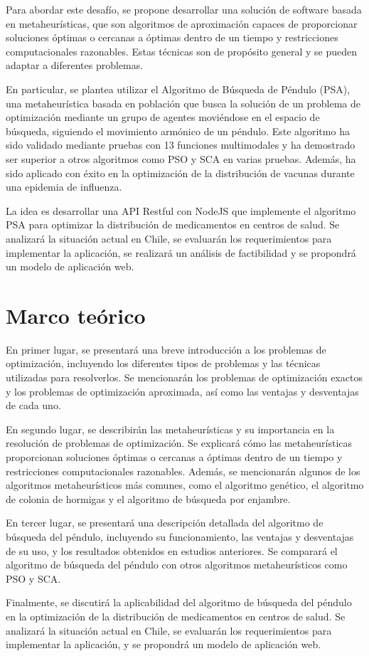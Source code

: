 \documentclass{ieeeaccess}
\begin{document}
Para abordar este desafío, se propone desarrollar una solución de software basada en metaheurísticas, que son algoritmos de aproximación capaces de proporcionar soluciones óptimas o cercanas a óptimas dentro de un tiempo y restricciones computacionales razonables. Estas técnicas son de propósito general y se pueden adaptar a diferentes problemas.

En particular, se plantea utilizar el Algoritmo de Búsqueda de Péndulo (PSA), una metaheurística basada en población que busca la solución de un problema de optimización mediante un grupo de agentes moviéndose en el espacio de búsqueda, siguiendo el movimiento armónico de un péndulo. Este algoritmo ha sido validado mediante pruebas con 13 funciones multimodales y ha demostrado ser superior a otros algoritmos como PSO y SCA en varias pruebas. Además, ha sido aplicado con éxito en la optimización de la distribución de vacunas durante una epidemia de influenza.

La idea es desarrollar una API Restful con NodeJS que implemente el algoritmo PSA para optimizar la distribución de medicamentos en centros de salud. Se analizará la situación actual en Chile, se evaluarán los requerimientos para implementar la aplicación, se realizará un análisis de factibilidad y se propondrá un modelo de aplicación web.

\section{Marco teórico}
\label{sec:TheoreticalFramework}
 En primer lugar, se presentará una breve introducción a los problemas de optimización, incluyendo los diferentes tipos de problemas y las técnicas utilizadas para resolverlos. Se mencionarán los problemas de optimización exactos y los problemas de optimización aproximada, así como las ventajas y desventajas de cada uno.

En segundo lugar, se describirán las metaheurísticas y su importancia en la resolución de problemas de optimización. Se explicará cómo las metaheurísticas proporcionan soluciones óptimas o cercanas a óptimas dentro de un tiempo y restricciones computacionales razonables. Además, se mencionarán algunos de los algoritmos metaheurísticos más comunes, como el algoritmo genético, el algoritmo de colonia de hormigas y el algoritmo de búsqueda por enjambre.

En tercer lugar, se presentará una descripción detallada del algoritmo de búsqueda del péndulo, incluyendo su funcionamiento, las ventajas y desventajas de su uso, y los resultados obtenidos en estudios anteriores. Se comparará el algoritmo de búsqueda del péndulo con otros algoritmos metaheurísticos como PSO y SCA.

Finalmente, se discutirá la aplicabilidad del algoritmo de búsqueda del péndulo en la optimización de la distribución de medicamentos en centros de salud. Se analizará la situación actual en Chile, se evaluarán los requerimientos para implementar la aplicación, y se propondrá un modelo de aplicación web.

\EOD
\end{document}

